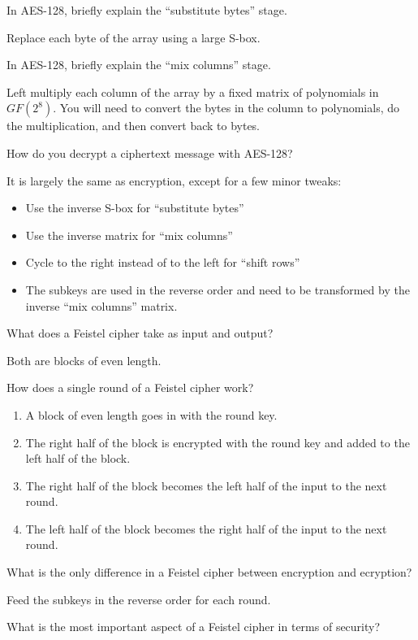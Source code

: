 \documentclass{article}
\newcounter{qcounter}
\newcommand{\showqcounter}{\theqcounter}
\newcommand{\question}{\vspace{5mm}\addtocounter{qcounter}{1}\vspace{5mm}{\bf Q\showqcounter: }}
\newcommand{\answer}{\vspace{5mm}{\bf A\showqcounter: }}
\begin{document}
\question In AES-128, briefly explain the ``substitute bytes'' stage.

\answer Replace each byte of the array using a large S-box.


\question In AES-128, briefly explain the ``mix columns'' stage.

\answer Left multiply each column of the array by a fixed matrix of polynomials in $GF(2^8)$. You will need to convert the 
  bytes in the column to polynomials, do the multiplication, and then convert back to bytes.


\question How do you decrypt a ciphertext message with AES-128?

\answer It is largely the same as encryption, except for a few minor tweaks:
  \begin{itemize}
    \item Use the inverse S-box for ``substitute bytes''
    \item Use the inverse matrix for ``mix columns''
    \item Cycle to the right instead of to the left for ``shift rows''
    \item The subkeys are used in the reverse order and need to be transformed by the inverse ``mix columns'' matrix.
  \end{itemize}


\question What does a Feistel cipher take as input and output?

\answer Both are blocks of even length.


\question How does a single round of a Feistel cipher work?

\answer 
  \begin{enumerate}
    \item A block of even length goes in with the round key. 
    \item The right half of the block is encrypted with the round key and added to the left half of the block.
    \item The right half of the block becomes the left half of the input to the next round.
    \item The left half of the block becomes the right half of the input to the next round.
  \end{enumerate}


\question What is the only difference in a Feistel cipher between encryption and ecryption?

\answer Feed the subkeys in the reverse order for each round.


\question What is the most important aspect of a Feistel cipher in terms of security?
\end{document}
